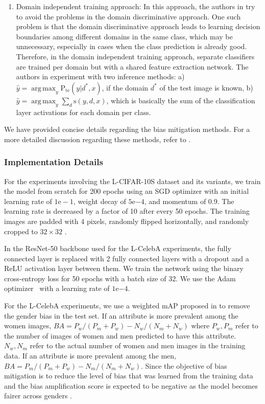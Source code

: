 \documentclass[10pt,twocolumn,letterpaper]{article}
\DeclareMathOperator*{\argmax}{arg\,max}
\newcommand{\pte}{\mathrm{P}_{\mathrm{te}}}
\newcommand{\score}{\mathrm{s}}
\newcommand{\knownd}{d^*}
\begin{document}
\begin{enumerate}
    \item Domain independent training approach: In this approach, the authors in \cite{wang2020towards} try to avoid the problems in the domain discriminative approach. One such problem is that the domain discriminative approach leads to learning decision boundaries among different domains in the same class, which may be unnecessary, especially in cases when the class prediction is already good. Therefore, in the domain independent training approach, separate classifiers are trained per domain but with a shared feature extraction network. The authors in \cite{wang2020towards} experiment with two inference methods: a) $\hat{y} = \argmax_y \pte(y|\knownd,x)$, if the domain $\knownd$ of the test image is known, b) $\hat{y} = \argmax_y \sum_d \score(y,d,x)$, which is basically the sum of the classification layer activations for each domain per class.
\end{enumerate}


We have provided concise details regarding the bias mitigation methods. For a more detailed discussion regarding these methods, refer to \cite{wang2020towards}.



\subsubsection{Implementation Details} %
For the experiments involving the L-CIFAR-10S dataset and its variants, we train the model from scratch for 200 epochs using an SGD optimizer with an initial learning rate of $1\mathrm{e}-1$, weight decay of $5 \mathrm{e}{-4}$, and momentum of 0.9. The learning rate is decreased by a factor of 10 after every 50 epochs. The training images are padded with 4 pixels, randomly flipped horizontally, and randomly cropped to $32\times32$ \cite{wang2020towards}.  

In the ResNet-50 backbone used for the L-CelebA experiments, the fully connected layer is replaced with 2 fully connected layers \cite{wang2020towards} with a dropout and a ReLU activation layer between them. We train the network using the binary cross-entropy loss for 50 epochs with a batch size of 32. We use the Adam optimizer~\cite{adam} with a learning rate of $1 \mathrm{e}{-4}$. 


For the L-CelebA experiments, we use a weighted mAP proposed in \cite{wang2020towards} to remove the gender bias in the test set. If an attribute is more prevalent among the women images, $BA = P_w/(P_m+P_w)-N_w/(N_m+N_w)$ where $P_w,P_m$ refer to the number of images of women and men predicted to have this attribute. $N_w,N_m$ refer to the actual number of women and men images in the training data. If an attribute is more prevalent among the men, $BA = P_m/(P_m+P_w)-N_m/(N_m+N_w)$. Since the objective of bias mitigation is to reduce the level of bias that was learned from the training data and the bias amplification score is expected to be negative as the model becomes fairer across genders \cite{wang2020towards}. 
\end{document}
